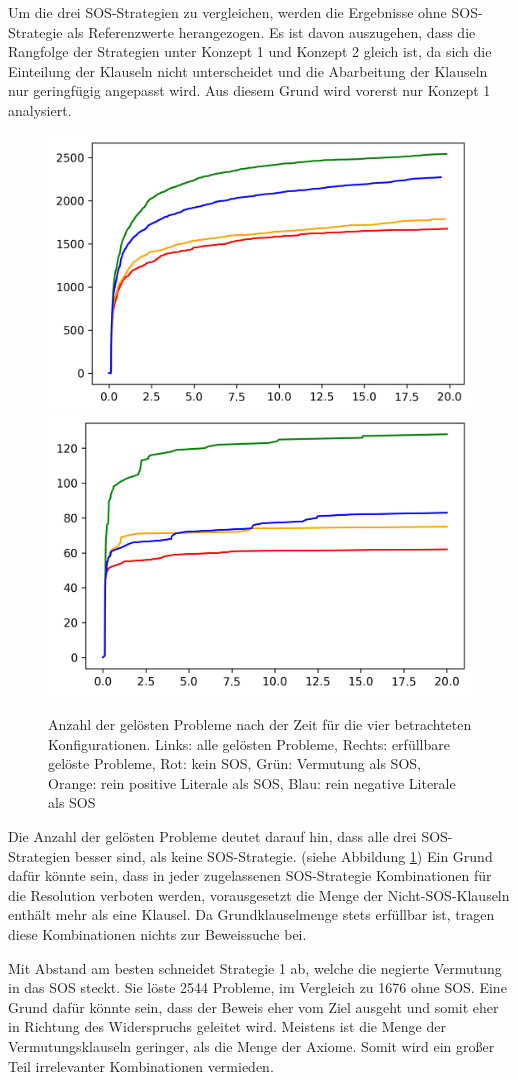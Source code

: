 	 	Um die drei SOS-Strategien zu vergleichen, werden die Ergebnisse ohne SOS-Strategie als Referenzwerte herangezogen.
	 	Es ist davon auszugehen, dass die Rangfolge der Strategien unter Konzept 1 und Konzept 2 gleich ist, da sich die Einteilung der Klauseln nicht unterscheidet und die Abarbeitung der Klauseln nur geringfügig angepasst wird. Aus diesem Grund wird vorerst nur Konzept 1 analysiert.
	 	\begin{figure}
	 		\centering
	 		\includegraphics[width=0.45\linewidth]{images/Diagram/time_comapre}
	 		\includegraphics[width=0.45\linewidth]{images/Diagram/time_comapre2}
	 		\caption{Anzahl der gelösten Probleme nach der Zeit für die vier betrachteten Konfigurationen. Links: alle gelösten Probleme, Rechts: erfüllbare gelöste Probleme, Rot: kein SOS, Grün: Vermutung als SOS, Orange: rein positive Literale als SOS, Blau: rein negative Literale als SOS}
	 		\label{fig:timecomapre}
	 	\end{figure}
	 	
	 	Die Anzahl der gelösten Probleme deutet darauf hin, dass alle drei SOS-Strategien besser sind, als keine SOS-Strategie. (siehe Abbildung \ref{fig:timecomapre})
	 	Ein Grund dafür könnte sein, dass in jeder zugelassenen SOS-Strategie Kombinationen für die Resolution verboten werden, vorausgesetzt die Menge der Nicht-SOS-Klauseln enthält mehr als eine Klausel. Da Grundklauselmenge stets erfüllbar ist, tragen diese Kombinationen nichts zur Beweissuche bei.
	 	
	 	Mit Abstand am besten schneidet Strategie 1 ab, welche die negierte Vermutung in das SOS steckt. Sie löste 2544 Probleme, im Vergleich zu 1676 ohne SOS. Eine Grund dafür könnte sein, dass der Beweis eher vom Ziel ausgeht und somit eher in Richtung des Widerspruchs geleitet wird. Meistens ist die Menge der Vermutungsklauseln geringer, als die Menge der Axiome. Somit wird ein großer Teil irrelevanter Kombinationen vermieden.
		
